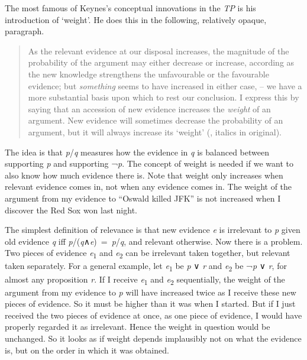 \documentclass[
  11pt,
  letterpaper,
  DIV=11,
  numbers=noendperiod,
  twoside]{scrartcl}
\begin{document}
The most famous of Keynes's conceptual innovations in the \emph{TP} is
his introduction of `weight'. He does this in the following, relatively
opaque, paragraph.

\begin{quote}
As the relevant evidence at our disposal increases, the magnitude of the
probability of the argument may either decrease or increase, according
as the new knowledge strengthens the unfavourable or the favourable
evidence; but \emph{something} seems to have increased in either case,
-- we have a more substantial basis upon which to rest our conclusion. I
express this by saying that an accession of new evidence increases the
\emph{weight} of an argument. New evidence will sometimes decrease the
probability of an argument, but it will always increase its `weight'
(, italics in original).
\end{quote}

The idea is that \emph{p}/\emph{q} measures how the evidence in \emph{q}
is balanced between supporting \emph{p} and supporting ¬\emph{p}. The
concept of weight is needed if we want to also know how much evidence
there is. Note that weight only increases when relevant evidence comes
in, not when any evidence comes in. The weight of the argument from my
evidence to ``Oswald killed JFK'' is not increased when I discover the
Red Sox won last night.

The simplest definition of relevance is that new evidence \emph{e} is
irrelevant to \emph{p} given old evidence \emph{q} iff
\emph{p}/(\emph{q}∧\emph{e})~=~\emph{p}/\emph{q}, and relevant
otherwise. Now there is a problem. Two pieces of evidence
\emph{e}\textsubscript{1} and \emph{e}\textsubscript{2} can be
irrelevant taken together, but relevant taken separately. For a general
example, let \emph{e}\textsubscript{1} be \emph{p} ∨ \emph{r} and
\emph{e}\textsubscript{2} be ¬\emph{p} ∨ \emph{r}, for almost any
proposition \emph{r}. If I receive \emph{e}\textsubscript{1} and
\emph{e}\textsubscript{2} sequentially, the weight of the argument from
my evidence to \emph{p} will have increased twice as I receive these new
pieces of evidence. So it must be higher than it was when I started. But
if I just received the two pieces of evidence at once, as one piece of
evidence, I would have properly regarded it as irrelevant. Hence the
weight in question would be unchanged. So it looks as if weight depends
implausibly not on what the evidence is, but on the order in which it
was obtained.
\end{document}
